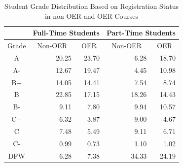 \documentclass[11pt]{article}
\begin{document}
\begin{table}
\centering
\begin{tabular}{crrrr}
  & \multicolumn{2}{c}{Full-Time Students} & \multicolumn{2}{c}{Part-Time Students} \\ \hline
  \multicolumn{1}{c}{Grade} & \multicolumn{1}{c}{Non-OER} & \multicolumn{1}{c}{OER} & \multicolumn{1}{c}{Non-OER} & \multicolumn{1}{c}{OER}\\ \hline
  A\hspace{1.1ex} & 20.25 & 23.70 & 6.28 & 18.70 \\
  A-\hspace{0.7ex} & 12.67 & 19.47 & 4.45 & 10.98 \\
  B+ & 14.05 & 14.41 & 7.54 & 8.74 \\
  B\hspace{1.1ex} & 22.85 & 17.15 & 18.26 & 14.43 \\
  B-\hspace{0.7ex} & 9.11 & 7.80 & 9.94 & 10.57 \\
  C+ & 6.32 & 3.87 & 9.00 & 4.67 \\
  C\hspace{1.1ex} & 7.48 & 5.49 & 9.11 & 6.71 \\
  C-\hspace{0.8ex} & 0.99 & 0.73 & 1.10 & 1.02 \\
  DFW & 6.28 & 7.38 & 34.33 & 24.19 \\ \hline
\end{tabular}
\caption{Student Grade Distribution Based on Registration Status in non-OER and OER Courses \cite{CB-WC-PH:18}}
\label{tab:part-time-oer}
\end{table}
\end{document}
